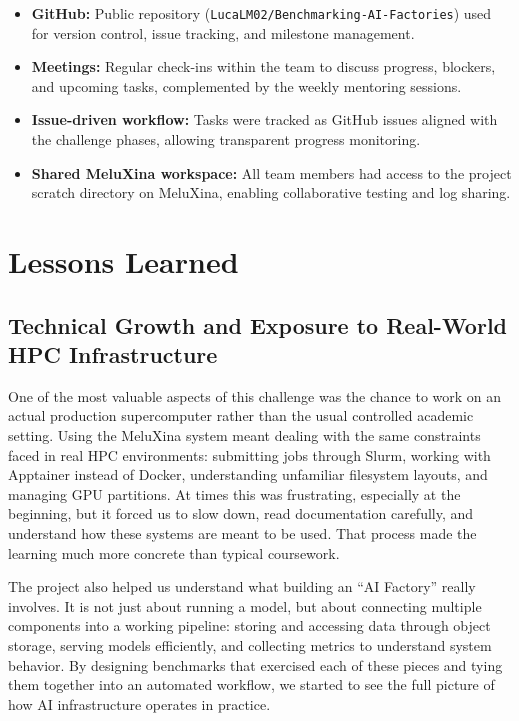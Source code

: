 \documentclass[11pt,a4paper]{article}
\begin{document}
\begin{itemize}[noitemsep]
    \item \textbf{GitHub:} Public repository (\texttt{LucaLM02/Benchmarking-AI-Factories}) used for version control, issue tracking, and milestone management.
    \item \textbf{Meetings:} Regular check-ins within the team to discuss progress, blockers, and upcoming tasks, complemented by the weekly mentoring sessions.
    \item \textbf{Issue-driven workflow:} Tasks were tracked as GitHub issues aligned with the challenge phases, allowing transparent progress monitoring.
    \item \textbf{Shared MeluXina workspace:} All team members had access to the project scratch directory on MeluXina, enabling collaborative testing and log sharing.
\end{itemize}

\section{Lessons Learned}

\subsection{Technical Growth and Exposure to Real-World HPC Infrastructure}

One of the most valuable aspects of this challenge was the chance to work on an actual production supercomputer rather than the usual controlled academic setting. Using the MeluXina system meant dealing with the same constraints faced in real HPC environments: submitting jobs through Slurm, working with Apptainer instead of Docker, understanding unfamiliar filesystem layouts, and managing GPU partitions. At times this was frustrating, especially at the beginning, but it forced us to slow down, read documentation carefully, and understand how these systems are meant to be used. That process made the learning much more concrete than typical coursework.

The project also helped us understand what building an ``AI Factory'' really involves. It is not just about running a model, but about connecting multiple components into a working pipeline: storing and accessing data through object storage, serving models efficiently, and collecting metrics to understand system behavior. By designing benchmarks that exercised each of these pieces and tying them together into an automated workflow, we started to see the full picture of how AI infrastructure operates in practice.
\end{document}

